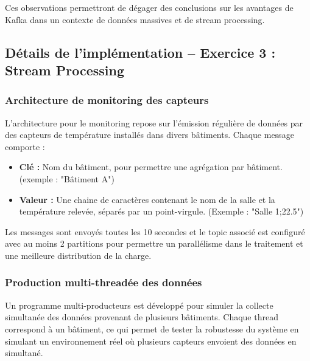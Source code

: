 Ces observations permettront de dégager des conclusions sur les avantages de Kafka dans un contexte de données massives et de stream processing.

\subsection{Détails de l’implémentation – Exercice 3 : Stream Processing}

\subsubsection{Architecture de monitoring des capteurs}
L’architecture pour le monitoring repose sur l’émission régulière de données par des capteurs de température installés dans divers bâtiments. Chaque message comporte :
\begin{itemize}
    \item \textbf{Clé :} Nom du bâtiment, pour permettre une agrégation par bâtiment. (exemple : "Bâtiment A")
    \item \textbf{Valeur :} Une chaine de caractères contenant le nom de la salle et la température relevée, séparés par un point-virgule. (Exemple : "Salle 1;22.5")
\end{itemize}

Les messages sont envoyés toutes les 10 secondes et le topic associé est configuré avec au moins 2 partitions pour permettre un parallélisme dans le traitement et une meilleure distribution de la charge.

\subsubsection{Production multi-threadée des données}
Un programme multi-producteurs est développé pour simuler la collecte simultanée des données provenant de plusieurs bâtiments. Chaque thread correspond à un bâtiment, ce qui permet de tester la robustesse du système en simulant un environnement réel où plusieurs capteurs envoient des données en simultané.

